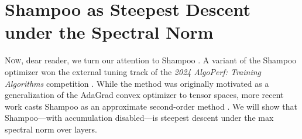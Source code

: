 \section{Shampoo as Steepest Descent under the Spectral Norm}
\label{sec:shampoo}

\lettrine{N}{ow}, dear reader, we turn our attention to Shampoo \citep{unified-shampoo,Gupta2018ShampooPS}. A variant of the Shampoo optimizer won the external tuning track of the \textit{2024 AlgoPerf: Training Algorithms} competition \citep{Dahl2023AlgoPerf}. While the method was originally motivated as a generalization of the AdaGrad convex optimizer \citep{Duchi2011AdaptiveSM} to tensor spaces, more recent work casts Shampoo as an approximate second-order method \citep{Anil2020ScalableSecondOrder,Morwani2024NewPerspective}. We will show that Shampoo---with accumulation disabled---is steepest descent under the max spectral norm over layers.

